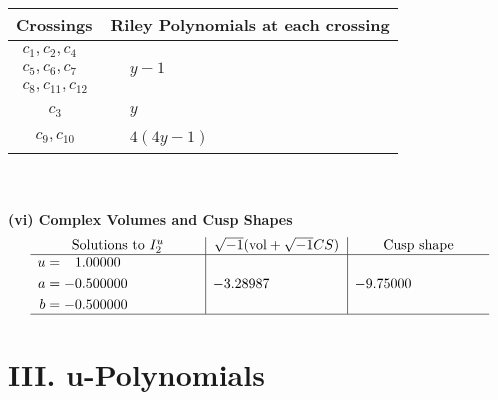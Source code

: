 \documentclass[1p]{elsarticle_modified}
\theoremstyle{definition}
\newcommand{\I}{\sqrt{-1}}
\begin{document}
\begin{tabular}{m{50pt}|m{274pt}}
Crossings & \hspace{64pt}Riley Polynomials at each crossing \\
\hline $$\begin{aligned}c_{1},c_{2},c_{4}\\c_{5},c_{6},c_{7}\\c_{8},c_{11},c_{12}\end{aligned}$$&$\begin{aligned}
&y-1
\end{aligned}$\\
\hline $$\begin{aligned}c_{3}\end{aligned}$$&$\begin{aligned}
&y
\end{aligned}$\\
\hline $$\begin{aligned}c_{9},c_{10}\end{aligned}$$&$\begin{aligned}
&4(4 y-1)
\end{aligned}$\\
\hline
\end{tabular}\\~\\
\newpage\flushleft \textbf{(vi) Complex Volumes and Cusp Shapes}
$$\begin{array}{c|c|c}  
\text{Solutions to }I^u_{2}& \I (\text{vol} + \sqrt{-1}CS) & \text{Cusp shape}\\
 \hline 
\begin{aligned}
u &= \phantom{-}1.00000\phantom{ +0.000000I} \\
a &= -0.500000\phantom{ +0.000000I} \\
b &= -0.500000\phantom{ +0.000000I}\end{aligned}
 & -3.28987\phantom{ +0.000000I} & -9.75000\phantom{ +0.000000I}\\
 \hline 
 \end{array}$$\newpage
\newpage\renewcommand{\arraystretch}{1}
\centering \section*{ III. u-Polynomials}
\end{document}
